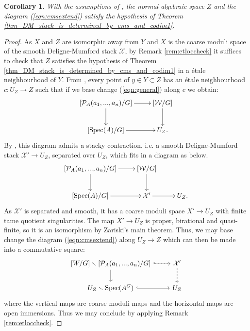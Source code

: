 \documentclass{amsart}
\newcommand{\cP}{\mathcal{P}}
\newcommand{\cW}{\mathcal{W}}
\newcommand{\cX}{\mathcal{X}}
\newcommand{\spec}{\operatorname{Spec}}
\newtheorem{Cor}[theorem]{Corollary}
\theoremstyle{definition}
\begin{document}
\begin{Cor}\label{cor_cms_has_finite_quotient_sing}
With the assumptions of , the normal algebraic space $Z$ and the diagram (\ref{eqn:cmsextend}) satisfy the hypothesis of Theorem \ref{thm_DM_stack_is_determined_by_cms_and_codim1}.
\end{Cor}
\begin{proof}
    As $X$ and $Z$ are isomorphic away from $Y$ and $X$ is the coarse moduli space of the smooth Deligne-Mumford stack $\cX$, by Remark \ref{rem:etloccheck} it suffices to check that $Z$ satisfies the hypothesis of Theorem \ref{thm_DM_stack_is_determined_by_cms_and_codim1} in a \'etale neighbourhood of $Y$. From , every point of $y \in Y \subset Z$ has an \'etale neighbourhood $c\colon U_Z \to Z$ such that if we base change (\ref{eqn:general}) along $c$ we obtain:
    $$\xymatrix{[\cP_A(a_1,...,a_n)/G]\ar[d] \ar[r] & [\cW/G]\ar[d] \\ [\spec(A)/G]\ar[r] & U_Z.}$$
    By , this diagram admits a stacky contraction, i.e. a smooth Deligne-Mumford stack $\cX'\to U_Z$, separated over $U_Z$, which fits in a diagram as below.
    $$\xymatrix{[\cP_A(a_1,...,a_n)/G]\ar[d] \ar[r] & [\cW/G]\ar[d] &\\ [\spec(A)/G]\ar[r] & \cX'\ar[r]&U_Z.}$$
    As $\cX'$ is separated and smooth, it has a coarse moduli space $X'\to U_Z$ with finite tame quotient singularities. The map $X'\to U_Z$ is proper, birational and quasi-finite, so it is an isomorphism by Zariski's main theorem. Thus, we may base change the diagram (\ref{eqn:cmsextend}) along $U_Z \to Z$ which can then be made into a commutative square:
 $$ 
    \begin{tikzcd}
    \mathrm{[}W/G\mathrm{]} \smallsetminus [\cP_A(a_1,...,a_n)/G] \arrow[d] \arrow[r, dashed, hook] & \cX' \arrow[d, dashed] \\
    U_Z \smallsetminus \spec(A^G) \arrow[r, hook]   & U_Z                  
    \end{tikzcd}
    $$
    where the vertical maps are coarse moduli maps and the horizontal maps are open immersions. Thus we may conclude by applying Remark \ref{rem:etloccheck}. \end{proof}
\end{document}
